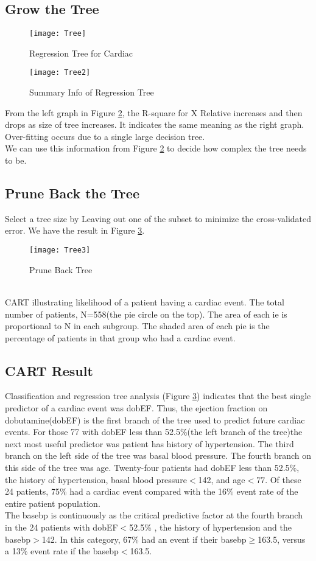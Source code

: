 \documentclass[a4paper,12pt]{article}
\begin{document}
  \subsection{Grow the Tree}
      \begin{figure}[t]
        \centering
        \texttt{[image: Tree]}
        \caption{Regression Tree for Cardiac}
        \label{Tree 1}
      \end{figure}
      \begin{figure}[htbp]
        \centering
        \texttt{[image: Tree2]}
        \caption{Summary Info of Regression Tree}
        \label{Tree 2}
      \end{figure}
  From the left graph in Figure \ref{Tree 2}, the R-square for X Relative increases and then drops as size of tree increases. It indicates the same meaning as the right graph. Over-fitting occurs due to a single large decision tree.\\
  We can use this information from Figure \ref{Tree 2} to decide how complex the tree needs to be.
  \subsection{Prune Back the Tree}
  Select a tree size by Leaving out one of the subset to minimize the cross-validated error. We have the result in Figure \ref{Tree 3}.
    \begin{figure}[htbp]
      \centering
      \texttt{[image: Tree3]}
      \caption{Prune Back Tree}
      \label{Tree 3}
    \end{figure}\\
  CART illustrating likelihood of a patient having a cardiac event. The total number of patients, N=558(the pie circle on the top). The area of each ie is proportional to N in each subgroup. The shaded area of each pie is the percentage of patients in that group who had a cardiac event.
  \subsection{CART Result}
  Classification and regression tree analysis (Figure \ref{Tree 3}) indicates that the best single predictor of a cardiac event was dobEF. Thus, the ejection fraction on dobutamine(dobEF) is the first branch of the tree used to predict future cardiac events. For those 77 with dobEF less than 52.5\%(the left branch of the tree)the next most useful predictor was patient has history of hypertension. The third branch on the left side of the tree was basal blood pressure. The fourth branch on this side of the tree was age. Twenty-four patients had dobEF less than 52.5\%, the history of hypertension,  basal blood pressure$ < $142, and age$ < $77. Of these 24 patients, 75\% had a cardiac event compared with the 16\% event rate of the entire patient population.\\
  The basebp is continuously as the critical predictive factor at the fourth branch in the 24 patients with dobEF$ < $52.5\% , the history of hypertension and the basebp$ > $142. In this category, 67\% had an event if their basebp$\ge$163.5, versus a 13\% event rate if the basebp$<$163.5.
\end{document}
